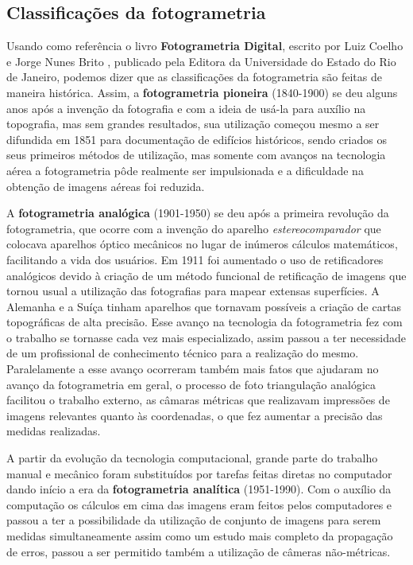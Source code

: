 \subsection{Classificações da fotogrametria}
Usando como referência o  livro \textbf{Fotogrametria Digital}, escrito por Luiz Coelho e Jorge Nunes Brito \cite{bib:livrofotogrametria}, publicado pela Editora da Universidade do Estado do Rio de Janeiro, podemos dizer que as classificações da fotogrametria são feitas de maneira histórica. Assim, a \textbf{fotogrametria pioneira} (1840-1900) se deu alguns anos após a invenção da fotografia e com a ideia de usá-la para auxílio na topografia, mas sem grandes resultados, sua utilização começou mesmo a ser difundida em 1851 para documentação de edifícios históricos, sendo criados os seus primeiros métodos de utilização, mas somente com avanços na tecnologia aérea a fotogrametria pôde realmente ser impulsionada e a dificuldade na obtenção de imagens aéreas foi reduzida. 


A \textbf{fotogrametria analógica} (1901-1950) se deu após a primeira revolução da fotogrametria, que ocorre com a invenção do aparelho \textit{estereocomparador} que colocava aparelhos óptico mecânicos no lugar de inúmeros cálculos matemáticos, facilitando a vida dos usuários. Em 1911 foi aumentado o uso de retificadores analógicos devido à criação de um método funcional de retificação de imagens que tornou usual a utilização das fotografias para mapear extensas superfícies. A Alemanha e a Suíça tinham aparelhos que tornavam possíveis a criação de cartas topográficas de alta precisão. Esse avanço na tecnologia da fotogrametria fez com o trabalho se tornasse cada vez mais especializado, assim passou a ter necessidade de um profissional de conhecimento técnico para a realização do mesmo. Paralelamente a esse avanço ocorreram também mais fatos que ajudaram no avanço da fotogrametria em geral, o processo de foto triangulação analógica facilitou o trabalho externo, as câmaras métricas que realizavam impressões de imagens relevantes quanto às coordenadas, o que fez aumentar a precisão das medidas realizadas.

A partir da evolução da tecnologia computacional, grande parte do trabalho manual e mecânico foram substituídos por tarefas feitas diretas no computador dando início a era da \textbf{fotogrametria analítica} (1951-1990). Com o auxílio da computação os cálculos em cima das imagens eram feitos pelos computadores e passou a ter a possibilidade da utilização de conjunto de imagens para serem medidas simultaneamente assim como um estudo mais completo da propagação de erros, passou a ser permitido também a utilização de câmeras não-métricas.

